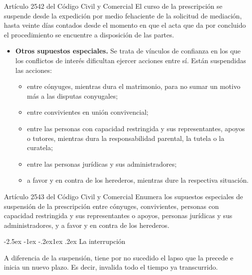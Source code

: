 \documentclass[12pt,oneside]{book}
\makeatletter
\renewcommand\subsection{\@startsection{subsection}{2}{\z@}%
  {-2.5ex \@plus -1ex \@minus -.2ex}{1ex \@plus .2ex}%
  {\normalfont\normalsize\bfseries}}
\makeatother
\begin{document}
\begin{articulo}{Artículo 2542 del Código Civil y Comercial}
El curso de la prescripción se suspende desde la expedición por medio fehaciente de la solicitud de mediación, hasta veinte días contados desde el momento en que el acta que da por concluido el procedimiento se encuentre a disposición de las partes.
\end{articulo}

\begin{itemize}
    \item \textbf{Otros supuestos especiales.} Se trata de vínculos de confianza en los que los conflictos de interés dificultan ejercer acciones entre sí. Están suspendidas las acciones:
    \begin{itemize}
        \item entre cónyuges, mientras dura el matrimonio, para no sumar un motivo más a las disputas conyugales;
        \item entre convivientes en unión convivencial;
        \item entre las personas con capacidad restringida y sus representantes, apoyos o tutores, mientras dura la responsabilidad parental, la tutela o la curatela;
        \item entre las personas jurídicas y sus administradores;
        \item a favor y en contra de los herederos, mientras dure la respectiva situación.
    \end{itemize}
\end{itemize}

\begin{articulo}{Artículo 2543 del Código Civil y Comercial}
Enumera los supuestos especiales de suspensión de la prescripción entre cónyuges, convivientes, personas con capacidad restringida y sus representantes o apoyos, personas jurídicas y sus administradores, y a favor y en contra de los herederos.
\end{articulo}

\subsection{La interrupción}

\begin{definicion}
A diferencia de la suspensión, tiene por no sucedido el lapso que la precede e inicia un nuevo plazo. Es decir, invalida todo el tiempo ya transcurrido.
\end{definicion}
\end{document}
